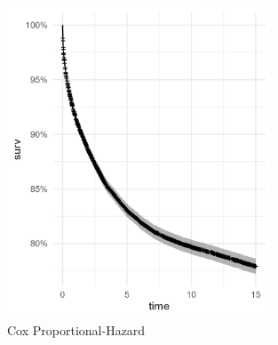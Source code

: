 \documentclass[12pt,letterpaper]{article}
\begin{document}
  \begin{figure}[!htbp]
	  \includegraphics[width=0.7\textwidth,height=0.5\textheight]{graphics/coxph.png}
	  \caption{Cox Proportional-Hazard}
	  \label{fig:cox}
	\end{figure}

  

\end{document}
